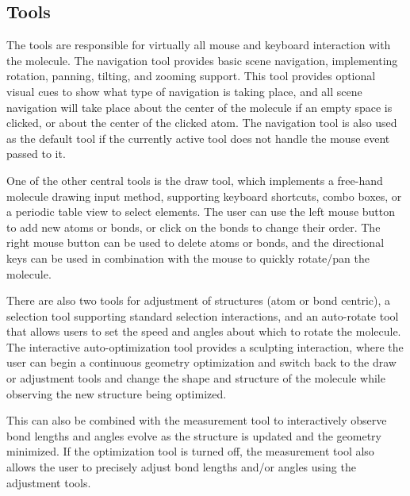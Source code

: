 \documentclass[10pt]{bmc_article}
\newenvironment{bmcformat}{\begin{raggedright}
\baselineskip20pt\sloppy\setboolean{publ}{false}}{\end{raggedright}
\baselineskip20pt\sloppy}
\begin{document}
\begin{bmcformat}
\subsection{Tools}

The tools are responsible for virtually all mouse and keyboard interaction with
the molecule. The navigation tool provides basic scene navigation, implementing
rotation, panning, tilting, and zooming support. This tool provides optional
visual cues to show what type of navigation is taking place, and all scene
navigation will take place about the center of the molecule if an empty space is
clicked, or about the center of the clicked atom. The navigation tool is also
used as the default tool if the currently active tool does not handle the mouse
event passed to it.

One of the other central tools is the draw tool, which implements a free-hand
molecule drawing input method, supporting keyboard shortcuts, combo boxes, or a
periodic table view to select elements. The user can use the left mouse button
to add new atoms or bonds, or click on the bonds to change their order. The
right mouse button can be used to delete atoms or bonds, and the directional keys
can be used in combination with the mouse to quickly rotate/pan the molecule.

There are also two tools for adjustment of structures (atom or bond centric), a
selection tool supporting standard selection interactions, and an auto-rotate
tool that allows users to set the speed and angles about which to rotate the
molecule. The interactive auto-optimization tool provides a sculpting
interaction, where the user can begin a continuous geometry optimization and
switch back to the draw or adjustment tools and change the shape and structure
of the molecule while observing the new structure being optimized.

This can also be combined with the measurement tool to interactively observe
bond lengths and angles evolve as the structure is updated and the geometry
minimized. If the optimization tool is turned off, the measurement tool also
allows the user to precisely adjust bond lengths and/or angles using the
adjustment tools.


\end{bmcformat}
\end{document}
